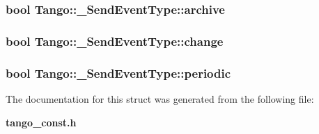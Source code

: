 \subsubsection[{archive}]{\setlength{\rightskip}{0pt plus 5cm}bool Tango\-::\-\_\-\-Send\-Event\-Type\-::archive}\label{structTango_1_1__SendEventType_ae6514fcf20154d6842697505732b50b2}
\subsubsection[{change}]{\setlength{\rightskip}{0pt plus 5cm}bool Tango\-::\-\_\-\-Send\-Event\-Type\-::change}\label{structTango_1_1__SendEventType_a6785aeda0925578d42e6466a7cc63a64}
\subsubsection[{periodic}]{\setlength{\rightskip}{0pt plus 5cm}bool Tango\-::\-\_\-\-Send\-Event\-Type\-::periodic}\label{structTango_1_1__SendEventType_a97a699c999ba0d8c88c00fc1cfcdac78}


The documentation for this struct was generated from the following file\-:\begin{DoxyCompactItemize}
\item 
{\bf tango\-\_\-const.\-h}\end{DoxyCompactItemize}

